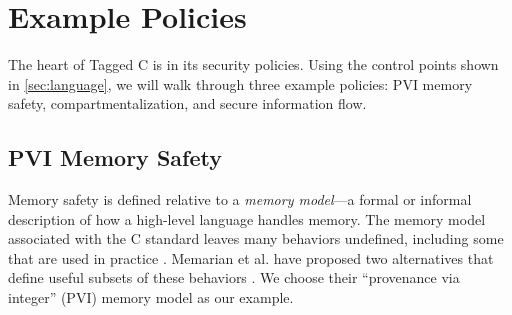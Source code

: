 \documentclass{llncs}
\begin{document}
{\section{Example Policies}
\label{sec:policies}

The heart of Tagged C is in its security policies.  Using the control points shown in \cref{sec:language},
we will walk through three example policies: PVI memory safety, compartmentalization, and
secure information flow.



\subsection{PVI Memory Safety}
\label{sec:PVI}

Memory safety is defined relative to a {\em memory model}---a formal or informal description of
how a high-level language handles memory. The memory model associated with the C standard leaves
many behaviors undefined, including some that are used in practice \cite{Memarian16:DeFacto}.
Memarian et al. have proposed two alternatives that define useful subsets of these behaviors
\cite{Memarian19:ExploringCSemantics}. We choose their ``provenance via integer'' (PVI) memory model
as our example.

}
\end{document}
